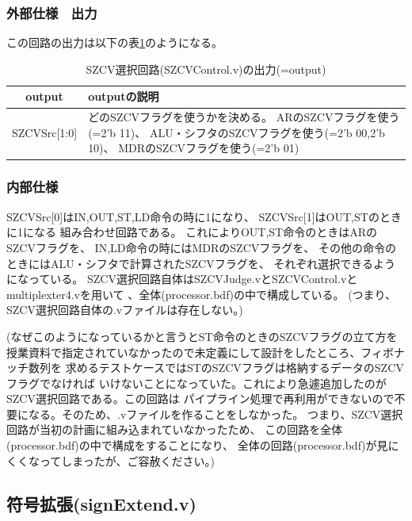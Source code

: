 \documentclass[a4j,titlepage]{jarticle}
\begin{document}
\subsubsection{外部仕様　出力}
この回路の出力は以下の表\ref{szcvcontrolO}のようになる。
\begin{table}[H]
    \caption{SZCV選択回路(SZCVControl.v)の出力(=output)}
    \label{szcvcontrolO}
    \begin{center}
    \begin {tabularx}{150mm}{|c|X|} \hline
         output & outputの説明 \\ \hline \hline
         SZCVSrc[1:0] & どのSZCVフラグを使うかを決める。
         ARのSZCVフラグを使う(=2'b 11)、
         ALU・シフタのSZCVフラグを使う(=2'b 00,2'b 10)、
         MDRのSZCVフラグを使う(=2'b 01)\\ \hline
    \end {tabularx}
    \end{center}
\end{table}

\subsubsection{内部仕様}
SZCVSrc[0]はIN,OUT,ST,LD命令の時に1になり、
SZCVSrc[1]はOUT,STのときに1になる
組み合わせ回路である。
これによりOUT,ST命令のときはARのSZCVフラグを、
IN,LD命令の時にはMDRのSZCVフラグを、
その他の命令のときにはALU・シフタで計算されたSZCVフラグを、
それぞれ選択できるようになっている。
SZCV選択回路自体はSZCVJudge.vとSZCVControl.vとmultiplexter4.vを用いて
、全体(processor.bdf)の中で構成している。
(つまり、SZCV選択回路自体の.vファイルは存在しない。)

(なぜこのようになっているかと言うとST命令のときのSZCVフラグの立て方を
授業資料で指定されていなかったので未定義にして設計をしたところ、フィボナッチ数列を
求めるテストケースではSTのSZCVフラグは格納するデータのSZCVフラグでなければ
いけないことになっていた。これにより急遽追加したのがSZCV選択回路である。この回路は
パイプライン処理で再利用ができないので不要になる。そのため、.vファイルを作ることをしなかった。
つまり、SZCV選択回路が当初の計画に組み込まれていなかったため、
この回路を全体(processor.bdf)の中で構成をすることになり、
全体の回路(processor.bdf)が見にくくなってしまったが、ご容赦ください。)


\newpage
\subsection{符号拡張(signExtend.v)}
\end{document}
